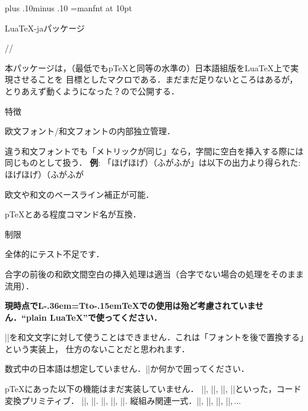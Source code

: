 
\overfullrule=0pt
\def\LaTeX{L\kern-.36em\setbox0=\hbox{T}\vbox to\ht0{\hbox{\sevenrm A}\vss}\kern-.15em\TeX}
\zw plus .10\zw minus .10\zw
\font\mff=manfnt at 10pt
\def\mf{{\mff META{\rm\-}FONT}}
\def\textfontii{\the\textfont2 }
\def\AmS{{\textfontii A\kern-.1667em\lower.5ex\hbox{M}\kern-.125emS}}
\def\UPSILON{\char'7}%
\def\XyM{X\kern-.30em\smash{\raise.50ex\hbox{\UPSILON}}\kern-.30em{M}}%
\def\XyMTeX{\XyM\kern-.1em\TeX}%


\centerline{\big Lua\TeX-jaパッケージ}\bigskip
\centerline{\large\the\year/\the\month/\the\day}\medskip

\bigskip

本パッケージは，（最低でもp\TeX と同等の水準の）日本語組版をLua\TeX 上で実現させることを
目標としたマクロである．まだまだ足りないところはあるが，とりあえず動くようになった？ので公開する． 


\beginparagraph 特徴

\item 欧文フォント/和文フォントの内部独立管理．
\item 違う和文フォントでも「メトリックが同じ」なら，字間に空白を挿入する際には同じものとして扱う．
{\bf 例}: 「ほげほげ）{\gt （ふがふが}」は以下の出力より得られた:
\begintt
ほげほげ）{\gt （ふがふが}
\endtt
\item 欧文や和文のベースライン補正が可能．
\item p\TeX とある程度コマンド名が互換．
\enditem

\beginparagraph 制限

\item 全体的にテスト不足です．
\item 合字の前後の和欧文間空白の挿入処理は適当{\small（合字でない場合の処理をそのまま流用）\inhibitglue}．
\item {\bf 現時点で\LaTeX での使用は殆ど考慮されていません．``plain Lua\TeX''で使ってください．}
\item |\accent|を和文文字に対して使うことはできません．これは「フォントを後で置換する」という実装上，
仕方のないことだと思われます．
\item 数式中の日本語は想定していません．|\hbox|か何かで囲ってください．
\item p\TeX にあった以下の機能はまだ実装していません．
\itemitem |\euc|, |\jis|, |\sjis|, |\kuten|といった，コード変換プリミティブ．
\itemitem |\kansuji|, |\kansujichar|.
\itemitem |\showmode|, |\jfam|, |\jcharwidowpenalty|.
\itemitem 縦組み関連一式．|\tate|, |\tfont|, |\tbaselineshift|, |\dtou|,$\,\ldots$
\enditem


